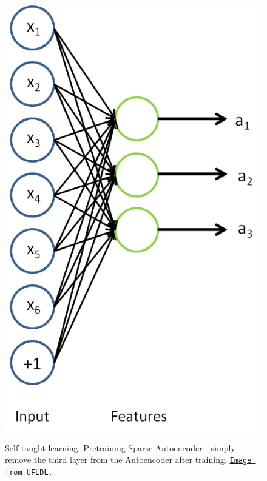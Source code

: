 \documentclass[12pt]{article}  %
\begin{document}
\begin{figure}[ht]
\centering
\begin{minipage}{.45\linewidth}
\includegraphics[scale=0.6]{images/SparseAE.png}\\
\caption{Self-taught learning: Pretraining Sparse Autoencoder - simply remove the third layer from the Autoencoder after training. \href{http://deeplearning.stanford.edu/wiki/index.php/Self-Taught_Learning_to_Deep_Networks}{\tt Image from UFLDL.}}\label{sparseAE-fig}
\end{minipage}
\hspace{.05\linewidth}
\begin{minipage}{.45\linewidth}

\end{minipage}
\end{figure}
\end{document}
